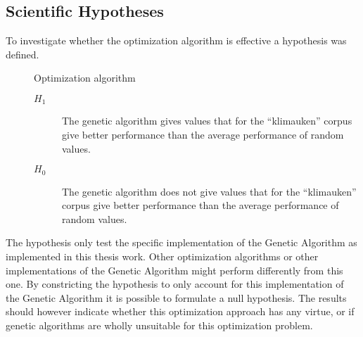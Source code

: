 \subsection{Scientific Hypotheses}

To investigate whether the optimization algorithm is effective a hypothesis was defined.



\begin{description}
	\item []Optimization algorithm
	\begin{description}
	\item [\(H_{1}\)] The genetic algorithm gives values that for the ``klimauken'' corpus give better performance than the average performance of random values.
	\item [\(H_{0}\)] The genetic algorithm does not give values that for the ``klimauken'' corpus give better performance than the average performance of random values.
	\end{description}
\end{description}

The hypothesis only test the specific implementation of the Genetic Algorithm as implemented in this thesis work. Other optimization algorithms or other implementations of the Genetic Algorithm might perform differently from this one. By constricting the hypothesis to only account for this implementation of the Genetic Algorithm it is possible to formulate a null hypothesis. The results should however indicate whether this optimization approach has any virtue, or if genetic algorithms are wholly unsuitable for this optimization problem.

